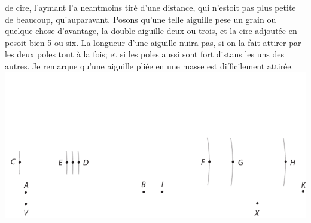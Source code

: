 de cire, l'aymant\protect{} l'a neantmoins tir\'{e} d'une distance, qui n'estoit pas plus petite de beaucoup, qu'auparavant.
\pend
\pstart
Posons qu'une telle aiguille\protect{} pese un grain ou quelque chose d'avantage, la double aiguille deux ou trois, et la cire\protect{} adjout\'{e}e en pesoit bien 5 ou six. La longueur d'une aiguille nuira pas, si on la fait attirer par les deux poles tout \`{a} la fois; et si  les poles aussi sont fort distans les uns des autres. Je remarque qu'une aiguille\protect{} pli\'{e}e en une masse est difficilement attir\'{e}e.
\pend
\vspace{2em}
\count{}
\count{}
\count{}
\pstart
{}
\centering
\includegraphics[trim = 0mm 0mm -3mm 25mm, clip, width=1.0\textwidth]{images/37316r_fig1.pdf}\\
\vspace*{0.5mm}
\pend